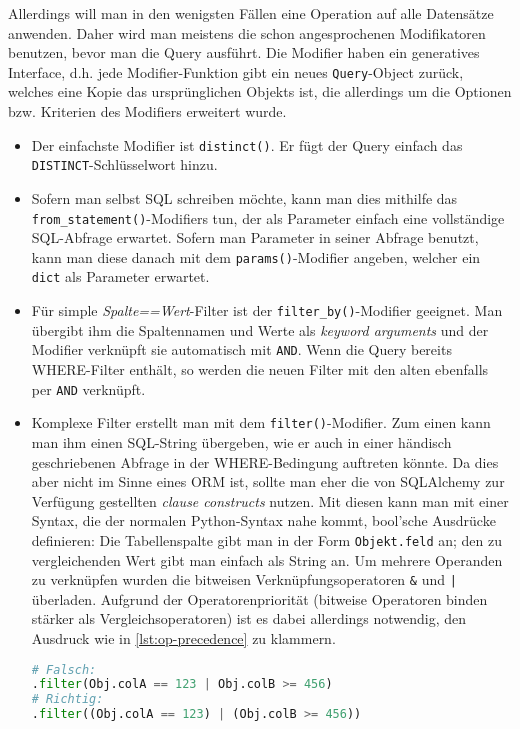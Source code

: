 Allerdings will man in den wenigsten Fällen eine Operation auf alle Datensätze
anwenden. Daher wird man meistens die schon angesprochenen Modifikatoren
benutzen, bevor man die Query ausführt. Die Modifier haben ein generatives
Interface, d.h. jede Modifier-Funktion gibt ein neues \texttt{Query}-Object
zurück, welches eine Kopie das ursprünglichen Objekts ist, die allerdings um die
Optionen bzw. Kriterien des Modifiers erweitert wurde.

\begin{itemize}
\item Der einfachste Modifier ist \texttt{distinct()}. Er fügt der Query einfach
das \texttt{DISTINCT}-Schlüsselwort hinzu.


\item Sofern man selbst SQL schreiben möchte, kann man dies mithilfe das
\texttt{from\_statement()}-Modifiers tun, der als Parameter einfach eine
vollständige SQL-Abfrage erwartet. Sofern man Parameter in seiner Abfrage
benutzt, kann man diese danach mit dem \texttt{params()}-Modifier angeben,
welcher ein \texttt{dict} als Parameter erwartet.


\item Für simple \emph{Spalte==Wert}-Filter ist der
\texttt{filter\_by()}-Modifier geeignet. Man übergibt ihm die Spaltennamen und
Werte als \textit{keyword arguments} und der Modifier verknüpft sie automatisch
mit \texttt{AND}. Wenn die Query bereits WHERE-Filter enthält, so werden die
neuen Filter mit den alten ebenfalls per \texttt{AND} verknüpft.


\item Komplexe Filter erstellt man mit dem \texttt{filter()}-Modifier. Zum einen
kann man ihm einen SQL-String übergeben, wie er auch in einer händisch
geschriebenen Abfrage in der WHERE-Bedingung auftreten könnte. Da dies aber
nicht im Sinne eines ORM ist, sollte man eher die von SQLAlchemy zur Verfügung
gestellten \emph{clause constructs} nutzen. Mit diesen kann man mit einer
Syntax, die der normalen Python-Syntax nahe kommt, bool'sche Ausdrücke
definieren: Die Tabellenspalte gibt man in der Form \texttt{Objekt.feld} an; den
zu vergleichenden Wert gibt man einfach als String an. Um mehrere Operanden zu
verknüpfen wurden die bitweisen Verknüpfungsoperatoren \texttt{\&} und
\texttt{|} überladen. Aufgrund der Operatorenpriorität (bitweise Operatoren binden
stärker als Vergleichsoperatoren) ist es dabei allerdings notwendig, den
Ausdruck wie in \autoref{lst:op-precedence} zu klammern.
\begin{lstlisting}[language=Python,label=lst:op-precedence,caption=Korrekte
Klammerung]
# Falsch:
.filter(Obj.colA == 123 | Obj.colB >= 456)
# Richtig:
.filter((Obj.colA == 123) | (Obj.colB >= 456))
\end{lstlisting}


\end{itemize}
